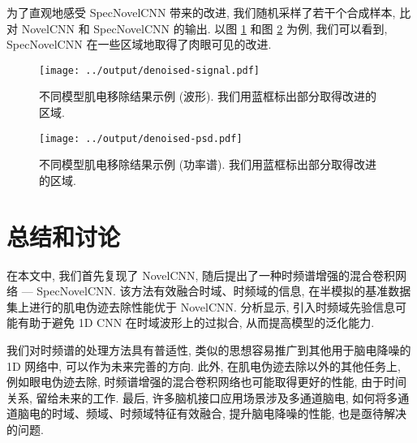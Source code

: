 \documentclass[12pt,a4paper]{article}
\begin{document}
为了直观地感受 SpecNovelCNN 带来的改进, 我们随机采样了若干个合成样本, 比对 NovelCNN 和 SpecNovelCNN 的输出. 以图 \ref{fig:denoised-signal} 和图 \ref{fig:denoised-psd} 为例, 我们可以看到, SpecNovelCNN 在一些区域地取得了肉眼可见的改进.

\begin{figure}[h]
    \centering
    \texttt{[image: ../output/denoised-signal.pdf]}
    \caption{不同模型肌电移除结果示例 (波形). 我们用蓝框标出部分取得改进的区域.}\label{fig:denoised-signal}
\end{figure}

\begin{figure}[h]
    \centering
    \texttt{[image: ../output/denoised-psd.pdf]}
    \caption{不同模型肌电移除结果示例 (功率谱). 我们用蓝框标出部分取得改进的区域.}\label{fig:denoised-psd}
\end{figure}

\section{总结和讨论}

在本文中, 我们首先复现了 NovelCNN, 随后提出了一种时频谱增强的混合卷积网络 — SpecNovelCNN. 该方法有效融合时域、时频域的信息, 在半模拟的基准数据集上进行的肌电伪迹去除性能优于 NovelCNN. 分析显示, 引入时频域先验信息可能有助于避免 1D CNN 在时域波形上的过拟合, 从而提高模型的泛化能力.

我们对时频谱的处理方法具有普适性, 类似的思想容易推广到其他用于脑电降噪的 1D 网络中, 可以作为未来完善的方向. 此外, 在肌电伪迹去除以外的其他任务上, 例如眼电伪迹去除, 时频谱增强的混合卷积网络也可能取得更好的性能, 由于时间关系, 留给未来的工作. 最后, 许多脑机接口应用场景涉及多通道脑电, 如何将多通道脑电的时域、频域、时频域特征有效融合, 提升脑电降噪的性能, 也是亟待解决的问题.

\clearpage


\end{document}
